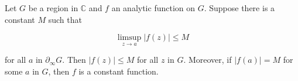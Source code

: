 Let $G$ be a region in $\mathbb{C}$ and $f$ an analytic function on $G$. Suppose there is a constant $M$ such that

$$\limsup_{z \to a} |f(z)| \leq M$$

for all $a$ in $\partial_{\infty} G$. Then $|f(z)| \leq M$ for all $z$ in $G$. Moreover, if $|f(a)| = M$ for some $a$ in $G$, then $f$ is a constant function.
